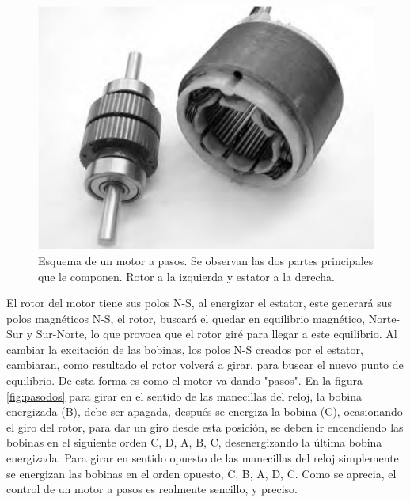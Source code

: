 \begin{figure}[h]
	\centering
	\includegraphics[width=0.7\linewidth]{Imagenes/2/RotorEstator}
	\caption{Esquema de un motor a pasos. Se observan las dos partes principales que le componen. Rotor a la izquierda y estator a la derecha. \cite{Acarnley2002}}
	\label{fig:rotorestator}
\end{figure}
El rotor del motor tiene sus polos N-S, al energizar el estator, este generará sus polos magnéticos N-S, el rotor, buscará el quedar en equilibrio magnético, Norte-Sur y Sur-Norte, lo que provoca que el rotor giré para llegar a este equilibrio. Al cambiar la excitación de las bobinas, los polos N-S creados por el estator, cambiaran, como resultado el rotor volverá a girar, para buscar el nuevo punto de equilibrio. De esta forma es como el motor va dando "pasos". En la figura \ref{fig:pasodos} para girar en el sentido de las manecillas del reloj, la bobina energizada (B), debe ser apagada, después se energiza la bobina (C), ocasionando el giro del rotor, para dar un giro desde esta posición, se deben ir encendiendo las bobinas en el siguiente orden C, D, A, B, C, desenergizando la última bobina energizada. Para girar en sentido opuesto de las manecillas del reloj simplemente se energizan las bobinas en el orden opuesto, C, B, A, D, C.
Como se aprecia, el control de un motor a pasos es realmente sencillo, y preciso. 
